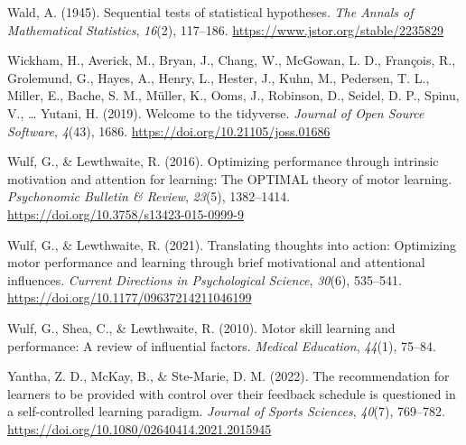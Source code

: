 \documentclass[
  doc, donotrepeattitle,floatsintext]{apa7}
\newlength{\cslhangindent}
\newlength{\cslentryspacingunit} %
\newenvironment{CSLReferences}[2] %
 {%
  \setlength{\parindent}{0pt}
  \ifodd #1
  \let\oldpar\par
  \def\par{\hangindent=\cslhangindent\oldpar}
  \fi
  \setlength{\parskip}{#2\cslentryspacingunit}
 }%
 {}
\begin{document}
\begin{CSLReferences}{1}{0}
\leavevmode{}%
Wald, A. (1945). Sequential tests of statistical hypotheses. \emph{The Annals of Mathematical Statistics}, \emph{16}(2), 117--186. \url{https://www.jstor.org/stable/2235829}

\leavevmode{}%
Wickham, H., Averick, M., Bryan, J., Chang, W., McGowan, L. D., François, R., Grolemund, G., Hayes, A., Henry, L., Hester, J., Kuhn, M., Pedersen, T. L., Miller, E., Bache, S. M., Müller, K., Ooms, J., Robinson, D., Seidel, D. P., Spinu, V., \ldots{} Yutani, H. (2019). Welcome to the {tidyverse}. \emph{Journal of Open Source Software}, \emph{4}(43), 1686. \url{https://doi.org/10.21105/joss.01686}

\leavevmode{}%
Wulf, G., \& Lewthwaite, R. (2016). Optimizing performance through intrinsic motivation and attention for learning: {The OPTIMAL} theory of motor learning. \emph{Psychonomic Bulletin \& Review}, \emph{23}(5), 1382--1414. \url{https://doi.org/10.3758/s13423-015-0999-9}

\leavevmode{}%
Wulf, G., \& Lewthwaite, R. (2021). Translating thoughts into action: Optimizing motor performance and learning through brief motivational and attentional influences. \emph{Current Directions in Psychological Science}, \emph{30}(6), 535--541. \url{https://doi.org/10.1177/09637214211046199}

\leavevmode{}%
Wulf, G., Shea, C., \& Lewthwaite, R. (2010). Motor skill learning and performance: A review of influential factors. \emph{Medical Education}, \emph{44}(1), 75--84.

\leavevmode{}%
Yantha, Z. D., McKay, B., \& Ste-Marie, D. M. (2022). The recommendation for learners to be provided with control over their feedback schedule is questioned in a self-controlled learning paradigm. \emph{Journal of Sports Sciences}, \emph{40}(7), 769--782. \url{https://doi.org/10.1080/02640414.2021.2015945}

\end{CSLReferences}
\end{document}
